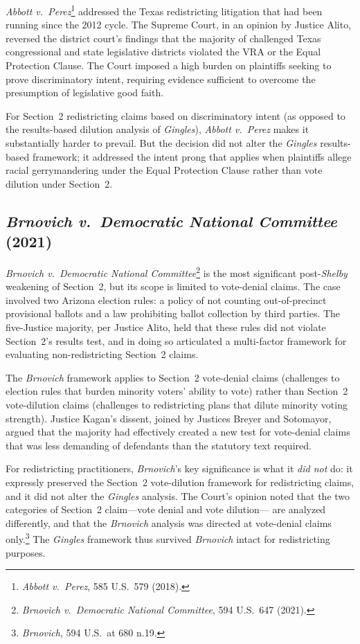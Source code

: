\textit{Abbott v.\ Perez}\footnote{\textit{Abbott v.\ Perez}, 585 U.S.\ 579
(2018).} addressed the Texas redistricting litigation that had been running
since the 2012 cycle. The Supreme Court, in an opinion by Justice Alito,
reversed the district court's findings that the majority of challenged
Texas congressional and state legislative districts violated the VRA or the
Equal Protection Clause. The Court imposed a high burden on plaintiffs
seeking to prove discriminatory intent, requiring evidence sufficient to
overcome the presumption of legislative good faith.

For Section~2 redistricting claims based on discriminatory intent (as
opposed to the results-based dilution analysis of \textit{Gingles}),
\textit{Abbott v.\ Perez} makes it substantially harder to prevail. But
the decision did not alter the \textit{Gingles} results-based framework;
it addressed the intent prong that applies when plaintiffs allege racial
gerrymandering under the Equal Protection Clause rather than vote dilution
under Section~2.

\subsection{\textit{Brnovich v.\ Democratic National Committee} (2021)}

\textit{Brnovich v.\ Democratic National Committee}\footnote{\textit{Brnovich
v.\ Democratic National Committee}, 594 U.S.\ 647 (2021).} is the most
significant post-\textit{Shelby} weakening of Section~2, but its scope
is limited to vote-denial claims. The case involved two Arizona election
rules: a policy of not counting out-of-precinct provisional ballots and
a law prohibiting ballot collection by third parties. The five-Justice
majority, per Justice Alito, held that these rules did not violate
Section~2's results test, and in doing so articulated a multi-factor
framework for evaluating non-redistricting Section~2 claims.

The \textit{Brnovich} framework applies to Section~2 vote-denial claims
(challenges to election rules that burden minority voters' ability to vote)
rather than Section~2 vote-dilution claims (challenges to redistricting
plans that dilute minority voting strength). Justice Kagan's dissent,
joined by Justices Breyer and Sotomayor, argued that the majority had
effectively created a new test for vote-denial claims that was less
demanding of defendants than the statutory text required.

For redistricting practitioners, \textit{Brnovich}'s key significance
is what it \textit{did not} do: it expressly preserved the Section~2
vote-dilution framework for redistricting claims, and it did not alter
the \textit{Gingles} analysis. The Court's opinion noted that the
two categories of Section~2 claim---vote denial and vote dilution---
are analyzed differently, and that the \textit{Brnovich} analysis was
directed at vote-denial claims only.\footnote{\textit{Brnovich},
594 U.S.\ at 680 n.19.} The \textit{Gingles} framework thus survived
\textit{Brnovich} intact for redistricting purposes.

